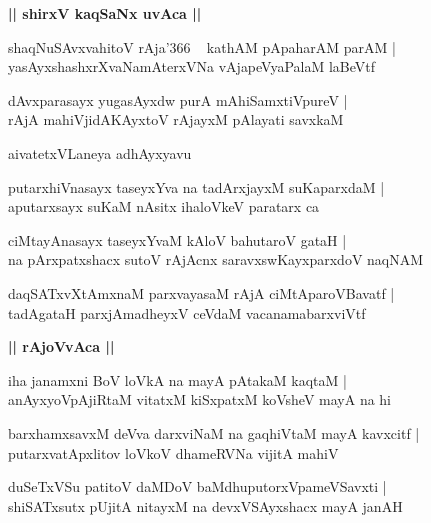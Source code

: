 \documentclass[twoside,12pt,openright]{book}
\newcounter{shloka}[chapter]
\def\uvaca#1{\centerline{{\large\textbf{#1}}}}
\begin{document}
\uvaca{|| shirxV kaqSaNx uvAca ||}

\begin{shloka}%
shaqNuSAvxvahitoV rAja\char'366 ~ kathAM pApaharAM parAM |\\
yasAyxshashxrXvaNamAterxVNa vAjapeVyaPalaM laBeVtf
\end{shloka}

\begin{shloka}%
dAvxparasayx yugasAyxdw purA mAhiSamxtiVpureV |\\
rAjA mahiVjidAKAyxtoV rAjayxM pAlayati savxkaM
\end{shloka}

\begin{center}
aivatetxVLaneya adhAyxyavu
\end{center}

\begin{shloka}%
putarxhiVnasayx taseyxYva na tadArxjayxM suKaparxdaM |\\
aputarxsayx suKaM nAsitx ihaloVkeV paratarx ca 
\end{shloka}

\begin{shloka}%
ciMtayAnasayx taseyxYvaM kAloV bahutaroV gataH |\\
na pArxpatxshacx sutoV rAjAcnx saravxswKayxparxdoV naqNAM 
\end{shloka}

\begin{shloka}%
daqSATxvXtAmxnaM parxvayasaM rAjA ciMtAparoVBavatf |\\
tadAgataH parxjAmadheyxV ceVdaM vacanamabarxviVtf
\end{shloka}

\uvaca{|| rAjoVvAca ||}

\begin{shloka}%
iha janamxni BoV loVkA na mayA pAtakaM kaqtaM |\\
anAyxyoVpAjiRtaM vitatxM kiSxpatxM koVsheV mayA na hi
\end{shloka}

\begin{shloka}%
barxhamxsavxM deVva darxviNaM na gaqhiVtaM mayA kavxcitf |\\
putarxvatApxlitov loVkoV dhameRVNa vijitA mahiV 
\end{shloka}

\begin{shloka}%
duSeTxVSu patitoV daMDoV baMdhuputorxVpameVSavxti |\\
shiSATxsutx pUjitA nitayxM na devxVSAyxshacx mayA janAH 
\end{shloka}
\end{document}
